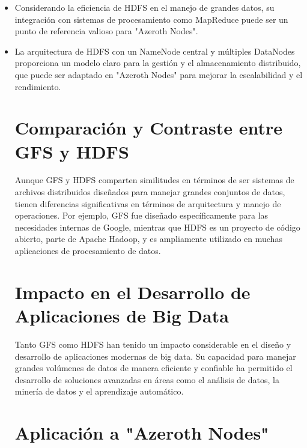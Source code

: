 \begin{itemize}
    \item Considerando la eficiencia de HDFS en el manejo de grandes datos, su integración con sistemas de procesamiento como MapReduce puede ser un punto de referencia valioso para "Azeroth Nodes".
    \item La arquitectura de HDFS con un NameNode central y múltiples DataNodes proporciona un modelo claro para la gestión y el almacenamiento distribuido, que puede ser adaptado en "Azeroth Nodes" para mejorar la escalabilidad y el rendimiento.
\section{Comparación y Contraste entre GFS y HDFS}

Aunque GFS y HDFS comparten similitudes en términos de ser sistemas de archivos distribuidos diseñados para manejar grandes conjuntos de datos, tienen diferencias significativas en términos de arquitectura y manejo de operaciones. Por ejemplo, GFS fue diseñado específicamente para las necesidades internas de Google, mientras que HDFS es un proyecto de código abierto, parte de Apache Hadoop, y es ampliamente utilizado en muchas aplicaciones de procesamiento de datos.

\section{Impacto en el Desarrollo de Aplicaciones de Big Data}

Tanto GFS como HDFS han tenido un impacto considerable en el diseño y desarrollo de aplicaciones modernas de big data. Su capacidad para manejar grandes volúmenes de datos de manera eficiente y confiable ha permitido el desarrollo de soluciones avanzadas en áreas como el análisis de datos, la minería de datos y el aprendizaje automático.

\section{Aplicación a "Azeroth Nodes"}


\end{itemize}
